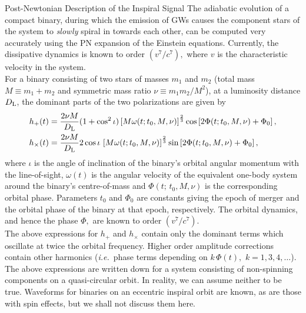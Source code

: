 \begin{itemize}
{Post-Newtonian Description of the Inspiral Signal}
{
The adiabatic evolution of a compact binary, during which the
emission of GWs causes the component stars
of the system to \emph{slowly} spiral in towards each other,
can be computed very accurately using the 
PN expansion of the Einstein equations. Currently, the
dissipative dynamics is known  to order
$(v^7/c^7),$ where $v$ is the characteristic velocity in
the system.
\\[5pt]%
For a binary consisting of two stars of masses $m_1$ and
$m_2$ (total mass $M\equiv m_1+m_2$ and symmetric mass ratio
$\nu\equiv m_1m_2/M^2$), at a luminosity distance $D_{\rm L}$,
the dominant parts of the two polarizations are given by
\begin{subequations}
\label{eq:amps}
\begin{align}
h_+(t) & = \frac{2\nu M}{D_{\rm L}}(1 + \cos^2\iota)
\left [M\omega(t;t_0,M,\nu) \right ]^{\frac{2}{3}} \cos \left [2\Phi(t; t_0, M,\nu) + \Phi_0 \right ],\\
h_\times(t) & = \frac{2\nu M}{D_{\rm L}}2\cos\iota\,
\left [M\omega(t;t_0,M,\nu) \right ]^{\frac{2}{3}} \sin \left [2\Phi(t;t_0, M,\nu) + \Phi_0 \right ],
\end{align}
\end{subequations}
where $\iota$ is the angle of inclination of the binary's orbital angular
momentum with the line-of-sight, $\omega(t)$ is the angular velocity
of the equivalent one-body system around the binary's centre-of-mass and
$\Phi(t;\, t_0,M,\nu)$ is the corresponding orbital phase. Parameters
$t_0$ and $\Phi_0$ are constants giving the epoch of merger and the
orbital phase of the binary at that epoch, respectively.
The orbital dynamics, and hence the phase $\Phi,$ are known to order
$(v^7/c^7)$.
\\[5pt]\indent
The above expressions for $h_+$ and $h_\times$ contain only the dominant
terms which oscillate at twice the orbital frequency. Higher order amplitude
corrections contain other harmonics (\emph{i.e.}\  phase terms depending on
$k\,\Phi(t),$ $k=1,3,4,\ldots$). 
The above expressions are
written down for a system consisting of non-spinning components on a
quasi-circular orbit. In reality, we can assume neither to be
true. Waveforms for binaries on an eccentric inspiral orbit are
known, as are those with spin effects, but we shall not discuss them here.
\vskip 0.2cm
}


\end{itemize}
